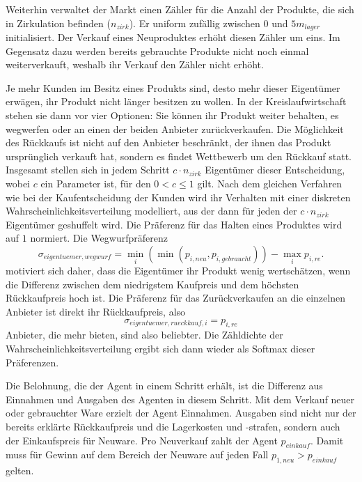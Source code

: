 Weiterhin verwaltet der Markt einen Zähler für die Anzahl der Produkte, die sich in Zirkulation befinden ($n_{zirk}$).
Er uniform zufällig zwischen $0$ und $5 m_{lager}$ initialisiert.
Der Verkauf eines Neuproduktes erhöht diesen Zähler um eins.
Im Gegensatz dazu werden bereits gebrauchte Produkte nicht noch einmal weiterverkauft, weshalb ihr Verkauf den Zähler nicht erhöht.

Je mehr Kunden im Besitz eines Produkts sind, desto mehr dieser Eigentümer erwägen, ihr Produkt nicht länger besitzen zu wollen.
In der Kreislaufwirtschaft stehen sie dann vor vier Optionen:
Sie können ihr Produkt weiter behalten, es wegwerfen oder an einen der beiden Anbieter zurückverkaufen.
Die Möglichkeit des Rückkaufs ist nicht auf den Anbieter beschränkt, der ihnen das Produkt ursprünglich verkauft hat, sondern es findet Wettbewerb um den Rückkauf statt.
Insgesamt stellen sich in jedem Schritt $c \cdot n_{zirk}$ Eigentümer dieser Entscheidung, wobei $c$ ein Parameter ist, für den $0 < c \leq 1$ gilt.
Nach dem gleichen Verfahren wie bei der Kaufentscheidung der Kunden wird ihr Verhalten mit einer diskreten Wahrscheinlichkeitsverteilung modelliert, aus der dann für jeden der $c \cdot n_{zirk}$ Eigentümer geshuffelt wird.
Die Präferenz für das Halten eines Produktes wird auf $1$ normiert.
Die Wegwurfpräferenz
\begin{equation}
	\sigma_{eigentuemer, wegwurf} = \min_{i}{\left(\min{(p_{i, neu}, p_{i, gebraucht})}\right)} - \max_{i}{p_{i, re}}.
\end{equation}
motiviert sich daher, dass die Eigentümer ihr Produkt wenig wertschätzen, wenn die Differenz zwischen dem niedrigstem Kaufpreis und dem höchsten Rückkaufpreis hoch ist.
Die Präferenz für das Zurückverkaufen an die einzelnen Anbieter ist direkt ihr Rückkaufpreis, also
\begin{equation}
	\sigma_{eigentuemer, rueckkauf, i} = p_{i, re}
\end{equation}
Anbieter, die mehr bieten, sind also beliebter.
Die Zähldichte der Wahrscheinlichkeitsverteilung ergibt sich dann wieder als Softmax dieser Präferenzen.

Die Belohnung, die der Agent in einem Schritt erhält, ist die Differenz aus Einnahmen und Ausgaben des Agenten in diesem Schritt.
Mit dem Verkauf neuer oder gebrauchter Ware erzielt der Agent Einnahmen.
Ausgaben sind nicht nur der bereits erklärte Rückkaufpreis und die Lagerkosten und -strafen, sondern auch der Einkaufspreis für Neuware.
Pro Neuverkauf zahlt der Agent $p_{einkauf}$.
Damit muss für Gewinn auf dem Bereich der Neuware auf jeden Fall $p_{1, neu} > p_{einkauf}$ gelten.

